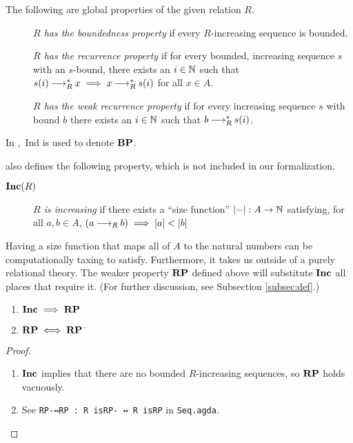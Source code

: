\begin{definition} \label{def:rp}
  The following are global properties of the given relation $R$.  \hfill
    \begin{description}
        \item[] \emph{$R$ has the boundedness property} if every $R$-increasing sequence is bounded.
        \item[] \emph{$R$ has the recurrence property} if for every bounded, increasing sequence $s$ with an $s$-bound, there exists an $i \in \mathbb{N}$ such that
        $s (i) \mathbin{\longrightarrow_R^*} x \implies x \mathbin{\longrightarrow_R^*} s (i)$ for all $x\in A$.
        \item[] \emph{$R$ has the weak recurrence property} if for every increasing sequence $s$ with bound $b$ there exists an $i \in \mathbb{N}$ such that $b \mathbin{\longrightarrow_R^*} s (i)$.
    \end{description}
\end{definition}

In \terese, $\mathrm{\,Ind}$ is used to denote $\mathbf{BP}$.

\terese also defines the following property, which is not included in our formalization.

\begin{definition} \hfill
    \begin{description}
        \item[$\mathbf{Inc}(R)$] \emph{$R$ is increasing} if there exists a ``size function'' $|{-}| : A \to \mathbb{N}$ satisfying, for all $a, b \in A$,
        $(a \mathbin{\longrightarrow_R} b) \implies |a| < |b|$
    \end{description}
\end{definition}

Having a size function that maps all of $A$ to the natural numbers can be computationally taxing to satisfy.
Furthermore, it takes us outside of a purely relational theory. The weaker property $\mathbf{RP}$ defined above will substitute $\mathbf{Inc}$ all places that require it. (For further discussion, see Subsection \ref{subsec:def}.)

\begin{proposition}\hfill
    \begin{enumerate}
        \item $\mathbf{Inc} \implies \mathbf{RP}$
        \item $\mathbf{RP} \iff \mathbf{RP^{-}}$
    \end{enumerate}
\end{proposition}

\begin{proof} \hfill
    \begin{enumerate}
        \item $\mathbf{Inc}$ implies that there are no bounded $R$-increasing sequences,
        so $\mathbf{RP}$ holds vacuously.
        \item See \verb|RP-↔RP : R isRP- ↔ R isRP| in \texttt{Seq.agda}. \qedhere
    \end{enumerate}
\end{proof}

